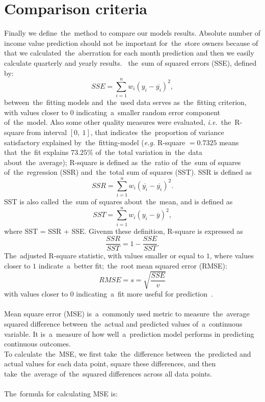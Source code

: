     \section{Comparison criteria}\label{subsec:comparison}
    Finally we define~the~method to compare our models results.
    Absolute number of income value prediction should not be important for~the~store owners because of that we
    calculated~the~aberration for each month prediction and then we easily calculate quarterly and yearly results.
   ~the~sum of squared errors (SSE), defined by:
    $$SSE = \sum^n_{i=1}w_i(y_i - \overline{y_i})^2,$$
    between~the~fitting models and~the~used data serves as~the~fitting criterion,
    with values closer to $0$ indicating~a~smaller random error component of~the~model.
    Also some other quality measures were evaluated, \textit{i.e.}~the~R-square from interval $[0,\ 1]$,
    that indicates~the~proportion of variance satisfactory explained by~the~fitting-model (\textit{e.g.}
    R-square $= 0.7325$ means that~the~fit explains $73.25\%$ of~the~total variation in~the~data about~the~average);
    R-square is defined as~the~ratio of~the~sum of squares of~the~regression (SSR) and~the~total sum of squares (SST).
    SSR is defined as
    $$SSR = \sum_{i=1}^nw_i(\overline{y_i} - \overline{y_i})^2.$$
    SST is also called~the~sum of squares about~the~mean, and is defined as
    $$SST = \sum_{i=1}^nw_i(y_i - \overline{y})^2,$$
    where SST = SSR + SSE. Givenm these definition, R-square is expressed as
    $$\frac{SSR}{SST} = 1 - \frac{SSE}{SST}.$$
    The~adjusted R-square statistic, with values smaller or equal to $1$, where values closer to $1$ indicate~a~better
    fit;~the~root mean squared error (RMSE):\\
    $$RMSE = s = \sqrt{\frac{SSE}{v}}$$
    with values closer to $0$ indicating~a~fit more useful for prediction~\cite{Jandera2021}.\\
    \\
    Mean square error (MSE) is~a~commonly used metric to measure~the~average squared difference between~the~actual and
    predicted values of~a~continuous variable. It is~a~measure of how well~a~prediction model performs in predicting
    continuous outcomes.\\
    To calculate~the~MSE, we first take~the~difference between~the~predicted and actual values for each data point,
    square these differences, and then take~the~average of~the~squared differences across all data points.\\
    \\
   The~formula for calculating MSE is:

